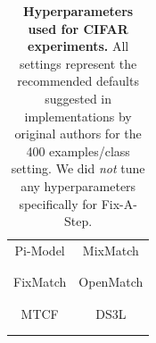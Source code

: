 \begin{table}[!h]
\begin{tabular}{c c}
		\\ %
		{\Large Pi-Model}
		&
		{\Large MixMatch}
		\\
		\begin{minipage}[t]{.5\textwidth}
		\strut\vspace*{-\baselineskip}\newline
				
		\end{minipage}
		&
		\begin{minipage}[t]{.5\textwidth}
		\strut\vspace*{-\baselineskip}\newline
				
		\end{minipage}
		\\ %
		\\ %
		{\Large FixMatch}
		&
		{\Large OpenMatch}
		\\
		\begin{minipage}[t]{.5\textwidth}
		\strut\vspace*{-\baselineskip}\newline
				
		\end{minipage}
		&
		\begin{minipage}[t]{.5\textwidth}
		\strut\vspace*{-\baselineskip}\newline
				
		\end{minipage}
		\\ %
		\\ %
		{\Large MTCF}
		&
		{\Large DS3L}
		\\
		\begin{minipage}[t]{.5\textwidth}
		\strut\vspace*{-\baselineskip}\newline
				
		\end{minipage}
		&
		\begin{minipage}[t]{.5\textwidth}
		\strut\vspace*{-\baselineskip}\newline
				
		\end{minipage}
		\\ %
		\\ %
		
		
	\end{tabular}
	\vspace{-.4cm}
\caption{
\textbf{Hyperparameters used for CIFAR experiments.}
All settings represent the recommended defaults suggested in implementations by original authors for the 400 examples/class setting.
We did \emph{not} tune any hyperparameters specifically for Fix-A-Step.
}%
\label{tab:hyperparameters_cifar}
\end{table}

